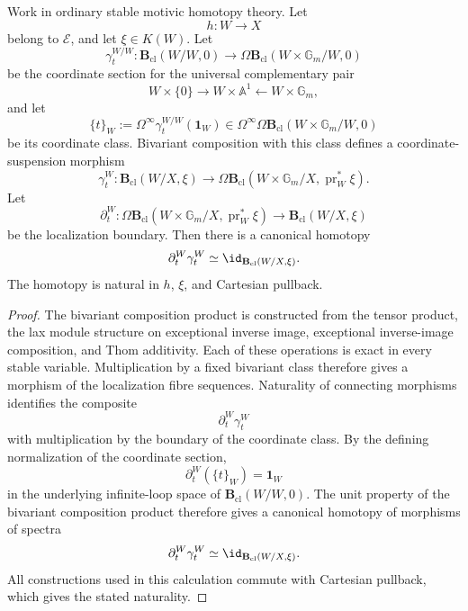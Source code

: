 \begin{lemma}
\label{lem:coordinate-cancellation}
Work in ordinary stable motivic homotopy theory.  Let
\[
    h:W\longrightarrow X
\]
belong to \(\mathcal E\), and let \(\xi\in K(W)\).  Let
\[
    \gamma_t^{W/W}:
    \mathbf B_{\mathrm{cl}}(W/W,0)
    \longrightarrow
    \Omega\mathbf B_{\mathrm{cl}}
    (W\times\mathbb G_m/W,0)
\]
be the coordinate section for the universal complementary pair
\[
    W\times\{0\}
    \longrightarrow
    W\times\mathbb A^1
    \longleftarrow
    W\times\mathbb G_m,
\]
and let
\[
    \{t\}_W
    :=
    \Omega^\infty\gamma_t^{W/W}(\mathbf1_W)
    \in
    \Omega^\infty\Omega\mathbf B_{\mathrm{cl}}
    (W\times\mathbb G_m/W,0)
\]
be its coordinate class.  Bivariant composition with this class defines a
coordinate-suspension morphism
\[
    \gamma_t^W:
    \mathbf B_{\mathrm{cl}}(W/X,\xi)
    \longrightarrow
    \Omega\mathbf B_{\mathrm{cl}}
    (W\times\mathbb G_m/X,\operatorname{pr}_W^*\xi).
\]
Let
\[
    \partial_t^W:
    \Omega\mathbf B_{\mathrm{cl}}
    (W\times\mathbb G_m/X,\operatorname{pr}_W^*\xi)
    \longrightarrow
    \mathbf B_{\mathrm{cl}}(W/X,\xi)
\]
be the localization boundary.  Then there is a canonical homotopy
\[
    \partial_t^W\gamma_t^W
    \simeq
    \id_{\mathbf B_{\mathrm{cl}}(W/X,\xi)}.
\]
The homotopy is natural in \(h\), \(\xi\), and Cartesian pullback.
\end{lemma}

\begin{proof}
The bivariant composition product is constructed from the tensor product,
the lax module structure on exceptional inverse image, exceptional
inverse-image composition, and Thom additivity.  Each of these operations
is exact in every stable variable.  Multiplication by a fixed bivariant
class therefore gives a morphism of the localization fibre sequences.
Naturality of connecting morphisms identifies the composite
\[
    \partial_t^W\gamma_t^W
\]
with multiplication by the boundary of the coordinate class.  By the
defining normalization of the coordinate section,
\[
    \partial_t^W(\{t\}_W)
    =
    \mathbf1_W
\]
in the underlying infinite-loop space of
\(\mathbf B_{\mathrm{cl}}(W/W,0)\).  The unit property of the bivariant
composition product therefore gives a canonical homotopy of morphisms of
spectra
\[
    \partial_t^W\gamma_t^W
    \simeq
    \id_{\mathbf B_{\mathrm{cl}}(W/X,\xi)}.
\]
All constructions used in this calculation commute with Cartesian
pullback, which gives the stated naturality.
\end{proof}


